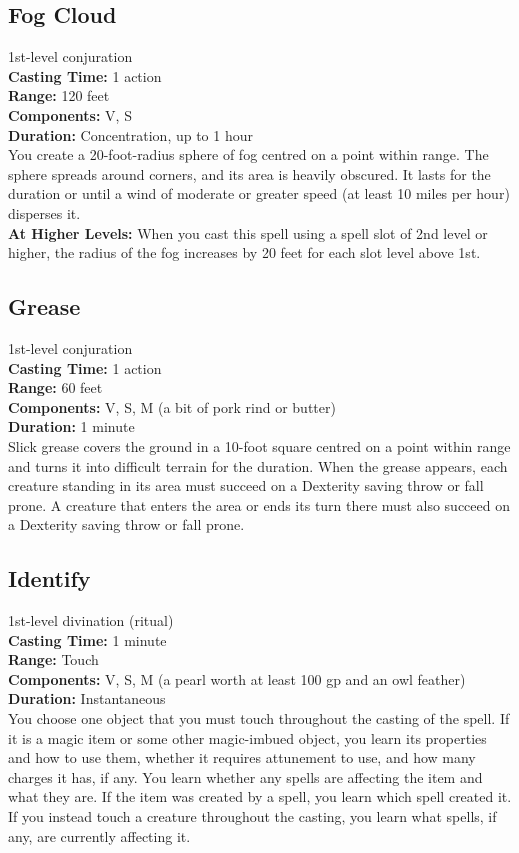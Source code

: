 \documentclass[11pt, A4paper, english]{article}
\begin{document}
		\subsection{Fog Cloud}
1st-level conjuration \\
\textbf{Casting Time:} 1 action \\
\textbf{Range:} 120 feet \\
\textbf{Components:} V, S \\
\textbf{Duration:} Concentration, up to 1 hour \\
You create a 20-foot-radius sphere of fog centred on a point within range. The sphere spreads around corners, and its area is heavily obscured. It lasts for the duration or until a wind of moderate or greater speed (at least 10 miles per hour) disperses it. \\
\textbf{At Higher Levels:} When you cast this spell using a spell slot of 2nd level or higher, the radius of the fog increases by 20 feet for each slot level above  1st.

		\subsection{Grease}
1st-level conjuration \\
\textbf{Casting Time:} 1 action \\
\textbf{Range:} 60 feet \\
\textbf{Components:} V, S, M (a bit of pork rind or butter) \\
\textbf{Duration:} 1 minute \\
Slick grease covers the ground in a  10-foot square centred on a point within range and turns it into difficult terrain for the duration. When the grease appears, each creature standing in its area must succeed on a Dexterity saving throw or fall prone. A creature that enters the area or ends its turn there must also succeed on a Dexterity saving throw or fall prone.

		\subsection{Identify}
1st-level divination (ritual) \\
\textbf{Casting Time:} 1 minute \\
\textbf{Range:} Touch \\
\textbf{Components:} V, S, M (a pearl worth at least  100 gp and an owl feather) \\
\textbf{Duration:} Instantaneous \\
You choose one object that you must touch throughout the casting of the spell. If it is a magic item or some other magic-imbued object, you learn its properties and how to use them, whether it requires attunement to use, and how many charges it has, if any. You learn whether any spells are affecting the item and what they are. If the item was created by a spell, you learn which spell created it. If you instead touch a creature throughout the casting, you learn what spells, if any, are currently affecting it.
\end{document}

